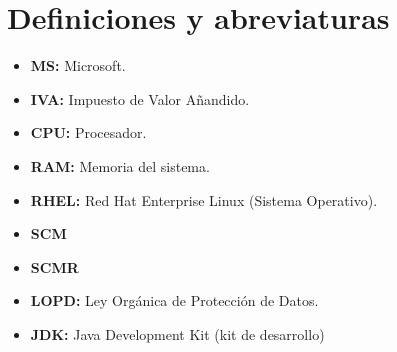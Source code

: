 \section{Definiciones y abreviaturas}
\begin{itemize}
	\item \textbf{MS:} Microsoft.
	\item \textbf{IVA:} Impuesto de Valor Añandido.
	\item \textbf{CPU:} Procesador.
	\item \textbf{RAM:} Memoria del sistema.
	\item \textbf{RHEL:} Red Hat Enterprise Linux (Sistema Operativo).
	\item \textbf{SCM}
	\item \textbf{SCMR}
	\item \textbf{LOPD:} Ley Orgánica de Protección de Datos.
	\item \textbf{JDK:} Java Development Kit (kit de desarrollo)
\end{itemize}
